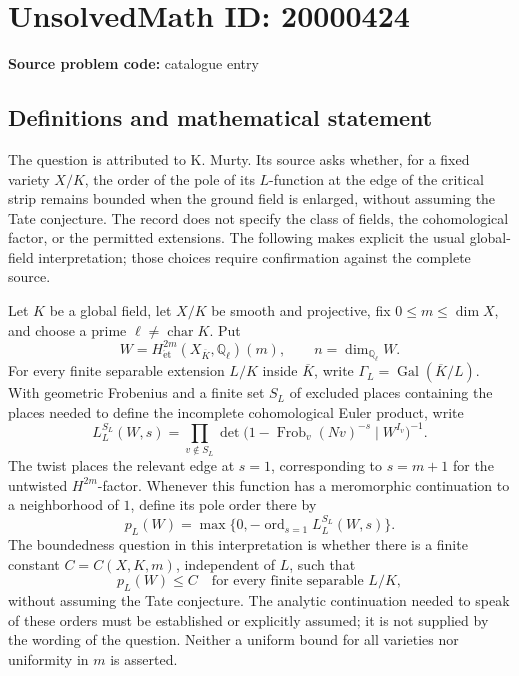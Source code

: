 \documentclass[11pt]{article}
\newcommand{\Q}{\mathbb{Q}}
\begin{document}
\section*{UnsolvedMath ID: 20000424}
\textbf{Source problem code:} catalogue entry
\subsection{Definitions and mathematical statement}
The question is attributed to K. Murty. Its source asks whether, for a fixed variety \(X/K\), the order of the pole of its \(L\)-function at the edge of the critical strip remains bounded when the ground field is enlarged, without assuming the Tate conjecture. The record does not specify the class of fields, the cohomological factor, or the permitted extensions. The following makes explicit the usual global-field interpretation; those choices require confirmation against the complete source.

Let \(K\) be a global field, let \(X/K\) be smooth and projective, fix \(0\leq m\leq\dim X\), and choose a prime \(\ell\ne\operatorname{char}K\). Put
\[
W=H^{2m}_{\mathrm{\acute et}}(X_{\overline K},\Q_\ell)(m),\qquad n=\dim_{\Q_\ell}W.
\]
For every finite separable extension \(L/K\) inside \(\overline K\), write \(\Gamma_L=\operatorname{Gal}(\overline K/L)\). With geometric Frobenius and a finite set \(S_L\) of excluded places containing the places needed to define the incomplete cohomological Euler product, write
\[
L^{S_L}_L(W,s)=\prod_{v\notin S_L}
\det\bigl(1-\operatorname{Frob}_v(Nv)^{-s}\mid W^{I_v}\bigr)^{-1}.
\]
The twist places the relevant edge at \(s=1\), corresponding to \(s=m+1\) for the untwisted \(H^{2m}\)-factor. Whenever this function has a meromorphic continuation to a neighborhood of \(1\), define its pole order there by
\[
p_L(W)=\max\{0,-\operatorname{ord}_{s=1}L^{S_L}_L(W,s)\}.
\]
The boundedness question in this interpretation is whether there is a finite constant \(C=C(X,K,m)\), independent of \(L\), such that
\[
p_L(W)\leq C\quad\text{for every finite separable }L/K,
\]
without assuming the Tate conjecture. The analytic continuation needed to speak of these orders must be established or explicitly assumed; it is not supplied by the wording of the question. Neither a uniform bound for all varieties nor uniformity in \(m\) is asserted.
\end{document}
